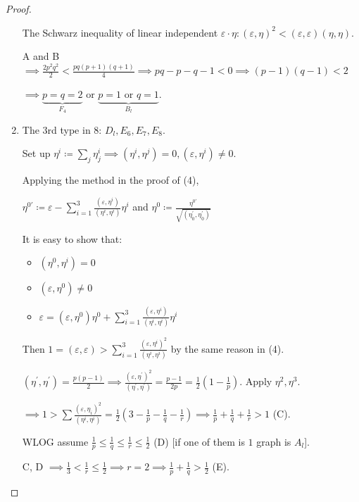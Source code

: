 \documentclass{article}
\theoremstyle{definition}
\begin{document}
\begin{proof}
\begin{enumerate}[label=\arabic*)]
    The Schwarz inequality of linear independent \(\varepsilon \cdot \eta : (\varepsilon , \eta)^2 < (\varepsilon, \varepsilon)(\eta, \eta)\).

    A and B \(\implies \frac{2 p^2 q^2}{2} < \frac{pq(p+1)(q+1)}{4} \implies pq - p - q - 1 < 0 \implies (p-1)(q-1) < 2\)
    
    \(\implies \underbrace{p=q=2}_{F_4}\) or \(\underbrace{p=1 \text{ or } q=1}_{B_l}\).
    
    \item The 3rd type in 8: \(D_l, E_6, E_7, E_8\).

    Set up \(\eta^i \coloneqq \sum_{j} \eta_j^i \implies (\eta^i, \eta^j) = 0, (\varepsilon , \eta^i) \neq 0\).
    
    Applying the method in the proof of (4),

    \(\eta^{0\prime} \coloneqq \varepsilon - \sum_{i=1}^3 \frac{(\varepsilon, \eta^i)}{(\eta^i, \eta^i)}\eta^i\) and \(\eta^0 \coloneqq \frac{\eta^{0\prime}}{\sqrt{(\eta_0^{\prime}, \eta_0^{\prime})} }\)  
    
    It is easy to show that:

    \begin{itemize}
        \item \((\eta^0, \eta^i) = 0\)
        \item \((\varepsilon, \eta^0) \neq 0\)
        \item \(\varepsilon = (\varepsilon, \eta^0)\eta^0 +\sum_{i=1}^3 \frac{(\varepsilon, \eta^i)}{(\eta^i, \eta^i)}\eta^i\)  
    \end{itemize} 

    Then \(1 = (\varepsilon , \varepsilon) > \sum_{i=1}^3 \frac{(\varepsilon, \eta^i)^2}{(\eta^i, \eta^i)}\) by the same reason in (4).

    \((\eta^{\prime} , \eta^{\prime}) = \frac{p(p-1)}{2}\implies \frac{(\varepsilon , \eta^{\prime})^2}{(\eta^{\prime} , \eta^{\prime})} = \frac{p-1}{2p} = \frac{1}{2}\left( 1 - \frac{1}{p} \right)\). Apply \(\eta^2, \eta^3\).
    
    \(\implies 1 > \sum \frac{(\varepsilon, \eta_i)^2}{(\eta^i, \eta^i)} = \frac{1}{2}\left( 3 - \frac{1}{p} - \frac{1}{q}- \frac{1}{r} \right) \implies \frac{1}{p} + \frac{1}{q} + \frac{1}{r} > 1\) (C).
    
    WLOG assume \(\frac{1}{p} \leq \frac{1}{q} \leq \frac{1}{r} \leq \frac{1}{2}\) (D) [if one of them is \(1\) graph is \(A_l\)].

    C, D \(\implies \frac{1}{3} < \frac{1}{r} \leq \frac{1}{2} \implies r = 2 \implies \frac{1}{p} + \frac{1}{q} > \frac{1}{2}\) (E).


\end{enumerate}
\end{proof}
\end{document}
